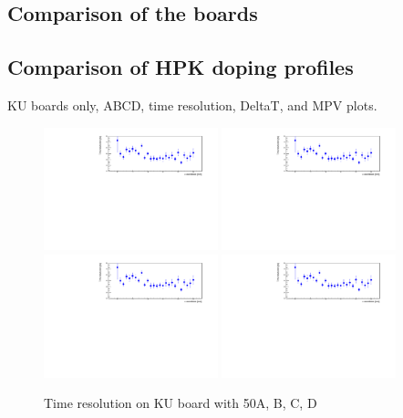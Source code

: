\documentclass[preprint,1p]{elsarticle}
\begin{document}
\subsection{Comparison of the boards}


\subsection{Comparison of HPK doping profiles}

KU boards only, ABCD, time resolution, DeltaT, and MPV plots. 

\begin{figure}[htbp] 
\centering
\includegraphics[width=0.45\textwidth]{figs/KUBoard_HPK50APix_Run843-846/TimeResolution_vs_X_Ch1_2.pdf} 
\includegraphics[width=0.45\textwidth]{figs/KUBoard_HPK50APix_Run843-846/TimeResolution_vs_X_Ch1_2.pdf} 
\includegraphics[width=0.45\textwidth]{figs/KUBoard_HPK50APix_Run843-846/TimeResolution_vs_X_Ch1_2.pdf} 
\includegraphics[width=0.45\textwidth]{figs/KUBoard_HPK50APix_Run843-846/TimeResolution_vs_X_Ch1_2.pdf} 
\caption{Time resolution on KU board with 50A, B, C, D } 
\label{fig:Sensors} 
\end{figure} 
\end{document}

